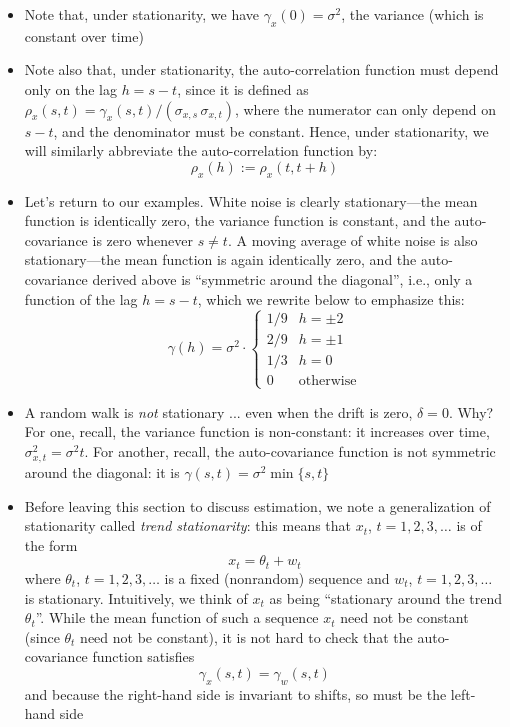\documentclass{article}
\begin{document}
\begin{itemize}
\item Note that, under stationarity, we have $\gamma_x(0) = \sigma^2$, the
  variance (which is constant over time) 

\item Note also that, under stationarity, the auto-correlation function must
  depend only on the lag $h = s-t$, since it is defined as $\rho_x(s, t) =
  \gamma_x(s, t) / ( \sigma_{x,s} \, \sigma_{x,t} )$, where the numerator can  
  only depend on $s-t$, and the denominator must be constant. Hence, under
  stationarity, we will similarly abbreviate the auto-correlation function by:
  \[
  \rho_x(h) := \rho_x(t, t+h)
  \]

\item Let's return to our examples. White noise is clearly stationary---the mean 
  function is identically zero, the variance function is constant, and the
  auto-covariance is zero whenever $s \not= t$. A moving average of white noise 
  is also stationary---the mean function is again identically zero, and the
  auto-covariance derived above is ``symmetric around the diagonal'', i.e., only
  a function of the lag $h = s-t$, which we rewrite below to emphasize this:   
  \[
  \gamma(h) = \sigma^2 \cdot
  \begin{cases}
  1 / 9 & h = \pm 2 \\
  2 / 9 & h = \pm 1 \\
  1 / 3 & h = 0 \\
  0 & \text{otherwise}
  \end{cases}
  \]

\item A random walk is \emph{not} stationary ... even when the drift is zero,
  $\delta = 0$. Why? For one, recall, the variance function is non-constant: it
  increases over time, $\sigma^2_{x,t} = \sigma^2 t$. For another, recall, the 
  auto-covariance function is not symmetric around the diagonal: it is
  $\gamma(s,t) = \sigma^2 \min\{s,t\}$ 

\item Before leaving this section to discuss estimation, we note a
  generalization of stationarity called \emph{trend stationarity}: this means
  that $x_t$, $t = 1,2,3,\dots$ is of the form 
  \[ 
  x_t = \theta_t + w_t
  \]
  where $\theta_t$, $t = 1,2,3,\dots$ is a fixed (nonrandom) sequence and $w_t$,
  $t = 1,2,3,\dots$ is stationary. Intuitively, we think of $x_t$ as being
  ``stationary around the trend $\theta_t$''. While the mean function of such a
  sequence $x_t$ need not be constant (since $\theta_t$ need not be constant),
  it is not hard to check that the auto-covariance function satisfies
  \[
  \gamma_x(s,t) = \gamma_w(s,t)
  \]
  and because the right-hand side is invariant to shifts, so must be the
  left-hand side 
\end{itemize}
\end{document}

